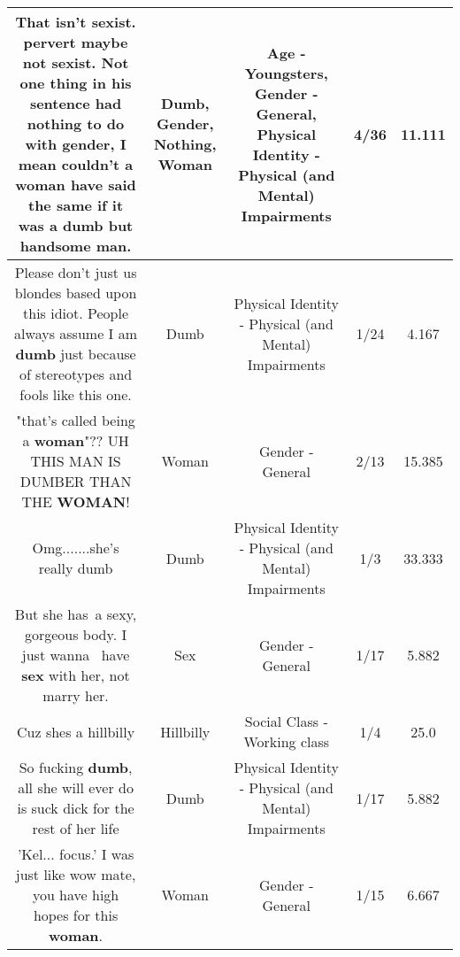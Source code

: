 \documentclass[11pt]{article}
\newlength\mylength
\begin{document}
\begin{center}
\begin{longtable}{|C{.65\mylength}|C{.30\mylength}|C{.12\mylength}|C{.12\mylength}|C{.12\mylength}|}
  \small That isn't sexist. pervert maybe not sexist. Not one thing in his sentence had \textbf{nothing} to do with \textbf{gender}, I mean couldn't a \textbf{woman} have said the same if it was a \textbf{dumb} but handsome man.\normalsize   & Dumb, Gender, Nothing, Woman & Age - Youngsters, Gender - General, Physical Identity - Physical (and Mental) Impairments & 4/36 & 11.111 \\  \hline
  \small Please don't just us blondes based upon this idiot. People always assume I am \textbf{dumb} just because of stereotypes and fools like this one.\normalsize   & Dumb & Physical Identity - Physical (and Mental) Impairments & 1/24 & 4.167 \\  \hline
  \small "that's called being a \textbf{woman}"?? UH THIS MAN IS DUMBER THAN THE \textbf{WOMAN}!\normalsize   & Woman & Gender - General & 2/13 & 15.385 \\  \hline
  \small Omg.......she's really dumb\normalsize   & Dumb & Physical Identity - Physical (and Mental) Impairments & 1/3 & 33.333 \\  \hline
  \small But she has a sexy, gorgeous body. I just wanna  have \textbf{sex} with her, not marry her.\normalsize   & Sex & Gender - General & 1/17 & 5.882 \\  \hline
  \small Cuz shes a hillbilly\normalsize   & Hillbilly & Social Class - Working class & 1/4 & 25.0 \\  \hline
  \small So fucking \textbf{dumb}, all she will ever do is suck dick for the rest of her life\normalsize   & Dumb & Physical Identity - Physical (and Mental) Impairments & 1/17 & 5.882 \\  \hline
  \small 'Kel... focus.' I was just like wow mate, you have high hopes for this \textbf{woman}.\normalsize   & Woman & Gender - General & 1/15 & 6.667 \\  \hline

\end{longtable}
\end{center}
\end{document}
